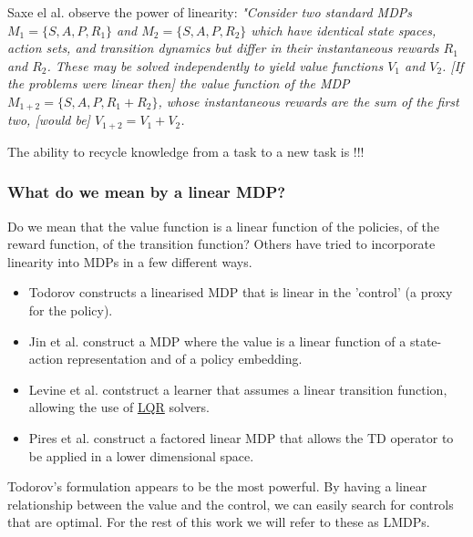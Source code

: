Saxe el al. observe the power of linearity: \textit{"Consider two standard MDPs
$M_1 = \{S, A, P, R_1\}$ and $M_2 = \{S, A, P, R_2\}$ which have
identical state spaces, action sets, and transition dynamics but differ in their
instantaneous rewards $R_1$ and $R_2$. These may be solved independently to
yield value functions $V_1$ and $V_2$. [If the problems were linear then] the value function of the MDP
$M_{1+2} = \{S, A, P, R_1 +R_2\}$, whose instantaneous rewards are the sum of the
first two, [would be] $V_{1+2} = V_1 + V_2$.} \cite{Saxea}

The ability to recycle knowledge from a task to a new task is !!!




\subsubsection{What do we mean by a linear MDP?}

Do we mean that the value function is a linear function of the policies,
of the reward function, of the transition function? Others have tried to incorporate
linearity into MDPs in a few different ways.

\begin{itemize}
  \tightlist
  \item Todorov constructs a linearised MDP that is linear in the 'control' (a proxy for the policy). \cite{Todorov2006}
  \item Jin et al. construct a MDP where the value is a linear function of a state-action representation and of a policy embedding. \cite{Wang}
  \item Levine et al. contstruct a learner that assumes a linear transition function, allowing the use of \href{https://en.wikipedia.org/wiki/Linear%E2%80%93quadratic_regulator}{LQR} solvers.\cite{Levine2019}
  \item Pires et al. construct a factored linear MDP that allows the TD operator to be applied in a lower dimensional space. \cite{Pires2016}
\end{itemize}

Todorov's formulation appears to be the most powerful. By having a linear
relationship between the value and the control, we can easily search for controls that
are optimal. For the rest of this work we will refer to these as LMDPs.

